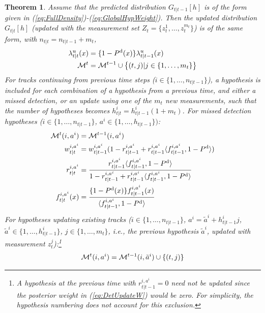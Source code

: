 \documentclass[journal,twoside]{IEEEtran}
\theoremstyle{plain}
\newtheorem{theorem}{Theorem}
\begin{document}
\begin{theorem}\label{th:Update}
Assume that the predicted distribution $G_{t|t-1}[h]$ is of the form given in (\ref{eq:FullDensity})-(\ref{eq:GlobalHypWeight}). Then the updated distribution $G_{t|t}[h]$ (updated with the measurement set $Z_t=\{z_t^1,\dots,z_t^{m_t}\}$) is of the same form, with $n_{t|t} = n_{t|t-1} + m_t$, 
%
{\allowdisplaybreaks \begin{align}
\lambda^u_{t|t}(x) &= \{1-P^{\mathrm{d}}(x)\}\lambda^u_{t|t-1}(x) \label{eq:UndetectedUpdate} \\
{\cal M}^t &= {\cal M}^{t-1} \cup \big\{(t,j)|j\in\{1,\dots,m_t\}\big\} 
\end{align}}
%
For tracks continuing from previous time steps ($i\in\{1,\dots,n_{t|t-1}\}$), a hypothesis is included for each combination of a hypothesis from a previous time, and either a missed detection, or an update using one of the $m_t$ new measurements, such that the number of hypotheses becomes $h^i_{t|t} = h^i_{t|t-1}(1+m_t)$. For missed detection hypotheses ($i\in\{1,\dots,n_{t|t-1}\}$, $a^i\in\{1,\dots,h_{t|t-1}\})$:
%
\begin{align}
{\cal M}^t(i,a^i) &= {\cal M}^{t-1}(i,a^i) \label{eq:MissUpdateMeasSet} \\
w_{t|t}^{i,a^i} &= w^{i,a^i}_{t|t-1}(1-r_{t|t-1}^{i,a^i}+r_{t|t-1}^{i,a^i}\langle f_{t|t-1}^{i,a^i},1-P^{\mathrm{d}}\rangle) \label{eq:MissUpdateW} \\
r^{i,a^i}_{t|t} &= \frac{r_{t|t-1}^{i,a^i}\langle f_{t|t-1}^{i,a^i},1-P^{\mathrm{d}}\rangle}{1-r_{t|t-1}^{i,a^i}+r_{t|t-1}^{i,a^i}\langle f_{t|t-1}^{i,a^i},1-P^{\mathrm{d}}\rangle} \label{eq:MissUpdatePex}\\
f^{i,a^i}_{t|t}(x) &= \frac{\{1-P^{\mathrm{d}}(x)\}f_{t|t-1}^{i,a^i}(x)}{\langle f_{t|t-1}^{i,a^i},1-P^{\mathrm{d}}\rangle} \label{eq:MissUpdateKin}
\end{align}
%
For hypotheses updating existing tracks ($i\in\{1,\dots,n_{t|t-1}\}$, $a^i=\tilde{a}^i+h^i_{t|t-1} j$, $\tilde{a}^i\in\{1,\dots,h^i_{t|t-1}\}$, $j\in\{1,\dots,m_t\}$, \textit{i.e.}\xspace, the previous hypothesis $\tilde{a}^i$, updated with measurement $z_t^j$):\footnote{A hypothesis at the previous time with $r^{i,a^i}_{t|t-1}=0$ need not be updated since the posterior weight in (\ref{eq:DetUpdateW}) would be zero. For simplicity, the hypothesis numbering does not account for this exclusion.}
%
\begin{align}
{\cal M}^t(i,a^i) &= {\cal M}^{t-1}(i,\tilde{a}^i) \cup \{(t,j)\} \label{eq:DetUpdateMeasSet} \\

\end{align}
\end{theorem}
\end{document}
